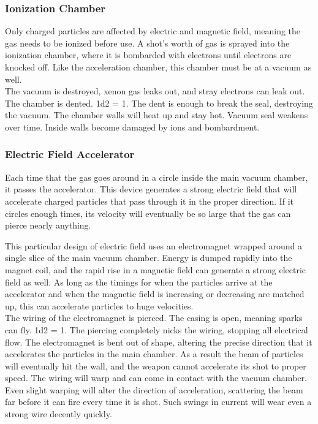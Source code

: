 \documentclass[a4paper]{article}
\begin{document}
\vspace{-0.5cm} \hspace{-18pt} \subsubsection{Ionization Chamber} \label{ray_ionization} \vspace{-0.2cm}
Only charged particles are affected by electric and magnetic field, meaning the gas needs to be ionized before use. A shot's worth of gas is sprayed into the ionization chamber, where it is bombarded with electrons until electrons are knocked off. Like the acceleration chamber, this chamber must be at a vacuum as well.
\\ \pbhw
{The vacuum is destroyed, xenon gas leaks out, and stray electrons can leak out.}
{The chamber is dented. \newline 1d2 = 1. The dent is enough to break the seal, destroying the vacuum.}
{The chamber walls will heat up and stay hot.}
{Vacuum seal weakens over time. Inside walls become damaged by ions and bombardment.}


\vspace{-0.5cm} \hspace{-18pt} \subsubsection{Electric Field Accelerator} \label{ray_accelerator} \vspace{-0.2cm}
Each time that the gas goes around in a circle inside the main vacuum chamber, it passes the accelerator. This device generates a strong electric field that will accelerate charged particles that pass through it in the proper direction. If it circles enough times, its velocity will eventually be so large that the gas can pierce nearly anything.

This particular design of electric field uses an electromagnet wrapped around a single slice of the main vacuum chamber. Energy is dumped rapidly into the magnet coil, and the rapid rise in a magnetic field can generate a strong electric field as well. As long as the timings for when the particles arrive at the accelerator and when the magnetic field is increasing or decreasing are matched up, this can accelerate particles to huge velocities.
\\ \pbhw
{The wiring of the electromagnet is pierced. The casing is open, meaning sparks can fly. \newline 1d2 = 1. The piercing completely nicks the wiring, stopping all electrical flow.}
{The electromagnet is bent out of shape, altering the precise direction that it accelerates the particles in the main chamber. As a result the beam of particles will eventually hit the wall, and the weapon cannot accelerate its shot to proper speed.}
{The wiring will warp and can come in contact with the vacuum chamber. Even slight warping will alter the direction of acceleration, scattering the beam far before it can fire every time it is shot.}
{Such swings in current will wear even a strong wire decently quickly.}
\end{document}
